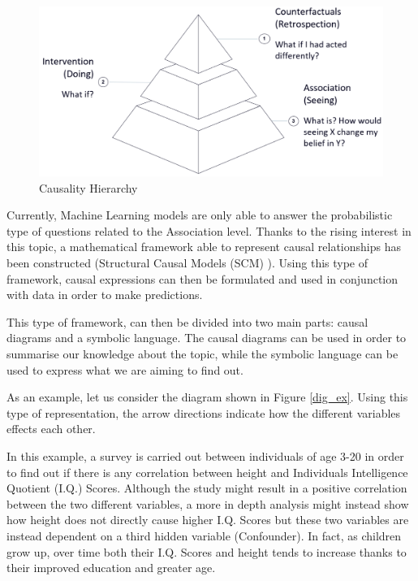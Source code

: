 \begin{figure}[ht!]%
    \centering
    \includegraphics[width=0.8\linewidth]{latex/images/pyramid.pdf}
    \vspace{-0.2cm}
    \caption{Causality Hierarchy}
    \label{pyr}
\end{figure}
\vspace{-0.5cm}

Currently, Machine Learning models are only able to answer the probabilistic type of questions related to the Association level.
Thanks to the rising interest in this topic, a mathematical framework able to represent causal relationships has been constructed (Structural Causal Models (SCM) \cite{tools}). Using this type of framework, causal expressions can then be formulated and used in conjunction with data in order to make predictions.

This type of framework, can then be divided into two main parts: causal diagrams and a symbolic language. The causal diagrams can be used in order to summarise our knowledge about the topic, while the symbolic language can be used to express what we are aiming to find out.

As an example, let us consider the diagram shown in Figure \ref{dig_ex}. Using this type of representation, the arrow directions indicate how the different variables effects each other.

In this example, a survey is carried out between individuals of age 3-20 in order to find out if there is any correlation between height and Individuals Intelligence Quotient (I.Q.) Scores. Although the study might result in a positive correlation between the two different variables, a more in depth analysis might instead show how height does not directly cause higher I.Q. Scores but these two variables are instead dependent on a third hidden variable (Confounder). In fact, as children grow up, over time both their I.Q. Scores and height tends to increase thanks to their improved education and greater age.  

